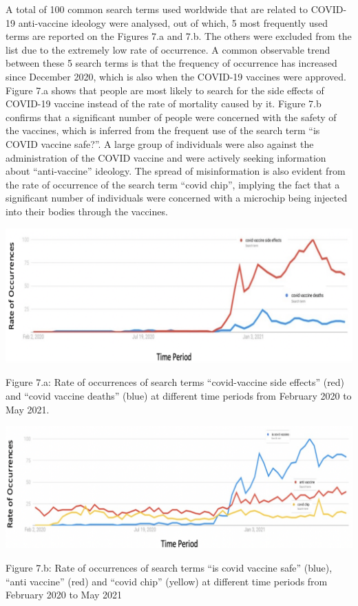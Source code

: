\documentclass[10pt,twocolumn,letterpaper]{article}
\begin{document}
A total of 100 common search terms used worldwide that are related to COVID-19 anti-vaccine ideology were analysed, out of which, 5 most frequently used terms are reported on the Figures 7.a and 7.b. The others were excluded from the list due to the extremely low rate of occurrence. A common observable trend between these 5 search terms is that the frequency of occurrence has increased since December 2020, which is also when the COVID-19 vaccines were approved. Figure 7.a shows that people are most likely to search for the side effects of COVID-19 vaccine instead of the rate of mortality caused by it. Figure 7.b confirms that a significant number of people were concerned with the safety of the vaccines, which is inferred from the frequent use of the search term “is COVID vaccine safe?”. A large group of individuals were also against the administration of the COVID vaccine and were actively seeking information about “anti-vaccine” ideology. The spread of misinformation is also evident from the rate of occurrence of the search term “covid chip”, implying the fact that a significant number of individuals were concerned with a microchip being injected into their bodies through the vaccines. 

\vspace{\baselineskip}
\vspace{\baselineskip}
\vspace{\baselineskip}

\includegraphics[scale=0.2]{fig7a.png}
\caption{Figure 7.a: Rate of occurrences of search terms “covid-vaccine side effects” (red) and “covid vaccine deaths” (blue) at different time periods from February 2020 to May 2021. }

\vspace{\baselineskip}

\includegraphics[scale=0.24]{fig7b.png}
\caption{Figure 7.b: Rate of occurrences of search terms “is covid vaccine safe” (blue), “anti vaccine” (red)  and “covid chip” (yellow) at different time periods from February 2020 to May 2021}
\end{document}
